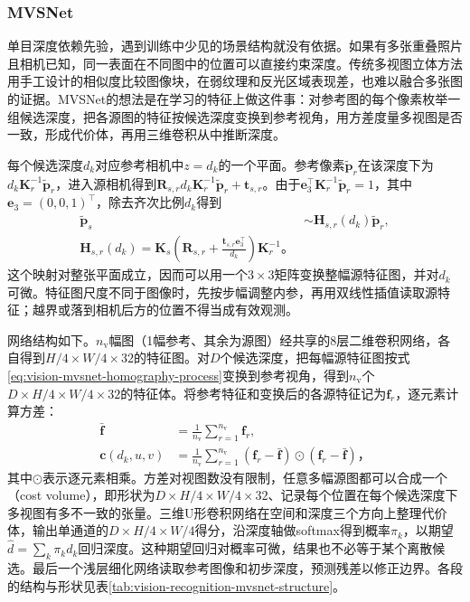 \subsubsection{MVSNet}
\label{sec:vision-recognition-mvsnet}

单目深度依赖先验，遇到训练中少见的场景结构就没有依据。如果有多张重叠照片且相机已知，同一表面在不同图中的位置可以直接约束深度。传统多视图立体方法用手工设计的相似度比较图像块，在弱纹理和反光区域表现差，也难以融合多张图的证据。MVSNet的想法是在学习的特征上做这件事：对参考图的每个像素枚举一组候选深度，把各源图的特征按候选深度变换到参考视角，用方差度量多视图是否一致，形成代价体，再用三维卷积从中推断深度。

每个候选深度$d_k$对应参考相机中$z=d_k$的一个平面。参考像素$\tilde{\bm p}_r$在该深度下为$d_k\bm K_r^{-1}\tilde{\bm p}_r$，进入源相机得到$\bm R_{s,r}d_k\bm K_r^{-1}\tilde{\bm p}_r+\bm t_{s,r}$。由于$\bm e_3^\top\bm K_r^{-1}\tilde{\bm p}_r=1$，其中$\bm e_3=(0,0,1)^\top$，除去齐次比例$d_k$得到
\begin{equation}
 \begin{aligned}
 \tilde{\bm p}_s&\sim\bm H_{s,r}(d_k)\tilde{\bm p}_r,\\
 \bm H_{s,r}(d_k)=
 \bm K_s\left(\bm R_{s,r}
 +\frac{\bm t_{s,r}\bm e_3^\top}{d_k}\right)\bm K_r^{-1}\text{。}
 \end{aligned}
 \label{eq:vision-mvsnet-homography-process}
\end{equation}
这个映射对整张平面成立，因而可以用一个$3\times3$矩阵变换整幅源特征图，并对$d_k$可微。特征图尺度不同于图像时，先按步幅调整内参，再用双线性插值读取源特征；越界或落到相机后方的位置不得当成有效观测。

网络结构如下。$n_{\mathrm v}$幅图（1幅参考、其余为源图）经共享的8层二维卷积网络，各自得到$H/4\times W/4\times32$的特征图。对$D$个候选深度，把每幅源特征图按式\eqref{eq:vision-mvsnet-homography-process}变换到参考视角，得到$n_{\mathrm v}$个$D\times H/4\times W/4\times32$的特征体。将参考特征和变换后的各源特征记为$\bm{f}_r$，逐元素计算方差：
\begin{equation}
 \begin{aligned}
 \bar{\bm{f}}&=\frac1{n_{\mathrm{v}}}\sum_{r=1}^{n_{\mathrm{v}}}\bm{f}_r,\\
 \bm{c}(d_k,u,v)&=\frac1{n_{\mathrm{v}}}\sum_{r=1}^{n_{\mathrm{v}}}
   (\bm{f}_r-\bar{\bm{f}})\odot(\bm{f}_r-\bar{\bm{f}})\text{，}
 \end{aligned}
 \label{eq:vision-mvs-cost}
\end{equation}
其中$\odot$表示逐元素相乘。方差对视图数没有限制，任意多幅源图都可以合成一个（cost volume），即形状为$D\times H/4\times W/4\times32$、记录每个位置在每个候选深度下多视图有多不一致的张量。三维U形卷积网络在空间和深度三个方向上整理代价体，输出单通道的$D\times H/4\times W/4$得分，沿深度轴做softmax得到概率$\pi_k$，以期望$\hat d=\sum_k\pi_kd_k$回归深度。这种期望回归对概率可微，结果也不必等于某个离散候选。最后一个浅层细化网络读取参考图像和初步深度，预测残差以修正边界。各段的结构与形状见表\ref{tab:vision-recognition-mvsnet-structure}。


